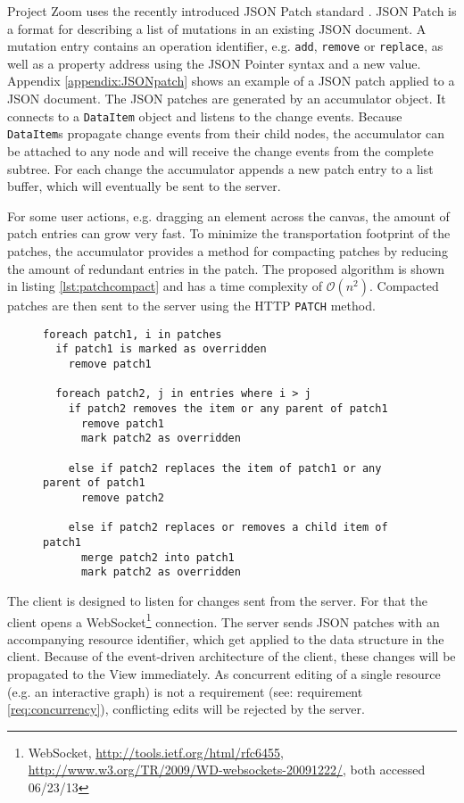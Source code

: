 Project Zoom uses the recently introduced JSON Patch standard \cite{RFC6902}. JSON Patch is a format for describing a list of mutations in an existing JSON document. A mutation entry contains an operation identifier, e.g. \texttt{add}, \texttt{remove} or \texttt{replace}, as well as a property address using the JSON Pointer syntax and a new value. Appendix \ref{appendix:JSONpatch} shows an example of a JSON patch applied to a JSON document. 
The JSON patches are generated by an accumulator object. It connects to a \texttt{DataItem} object and listens to the change events. Because \texttt{DataItem}s propagate change events from their child nodes, the accumulator can be attached to any node and will receive the change events from the complete subtree. For each change the accumulator appends a new patch entry to a list buffer, which will eventually be sent to the server.

For some user actions, e.g. dragging an element across the canvas, the amount of patch entries can grow very fast. To minimize the transportation footprint of the patches, the accumulator provides a method for compacting patches by reducing the amount of redundant entries in the patch. The proposed algorithm is shown in listing \ref{lst:patchcompact} and has a time complexity of $\mathcal O(n^2)$. Compacted patches are then sent to the server using the HTTP \texttt{PATCH} method.

\begin{figure}
\begin{lstlisting}[language=pseudo,caption={Pseudo code for compacting a chronologically ordered list of JSON patches},label={lst:patchcompact}]
foreach patch1, i in patches
  if patch1 is marked as overridden
    remove patch1
  
  foreach patch2, j in entries where i > j
    if patch2 removes the item or any parent of patch1
      remove patch1
      mark patch2 as overridden
      
    else if patch2 replaces the item of patch1 or any parent of patch1
      remove patch2
     
    else if patch2 replaces or removes a child item of patch1
      merge patch2 into patch1
      mark patch2 as overridden    
\end{lstlisting}
\end{figure}

The client is designed to listen for changes sent from the server. For that the client opens a WebSocket\footnote{WebSocket, \url{http://tools.ietf.org/html/rfc6455}, \url{http://www.w3.org/TR/2009/WD-websockets-20091222/}, both accessed 06/23/13} connection. The server sends JSON patches with an accompanying resource identifier, which get applied to the data structure in the client. Because of the event-driven architecture of the client, these changes will be propagated to the View immediately. As concurrent editing of a single resource (e.g. an interactive graph) is not a requirement (see: requirement \ref{req:concurrency}), conflicting edits will be rejected by the server.

